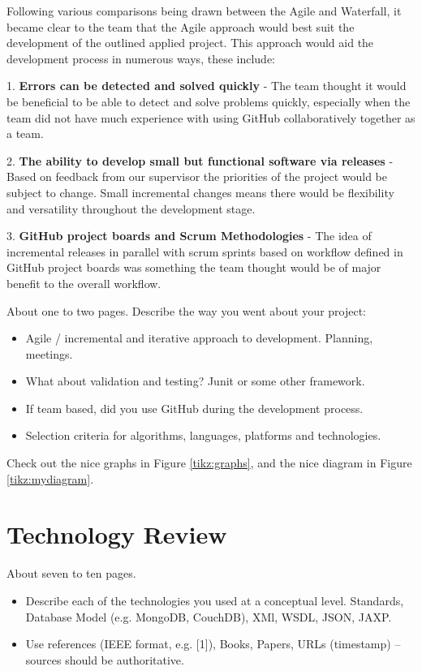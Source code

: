 Following various comparisons being drawn between the Agile and Waterfall, it became clear to the team that the Agile approach would best suit the development of the outlined applied project. This approach would aid the development process in numerous ways, these include:

\vspace{70mm} %

1. \textbf{Errors can be detected and solved quickly} - The team thought it would be beneficial to be able to detect and solve problems quickly, especially when the team did not have much experience with using GitHub collaboratively together as a team.

2. \textbf{The ability to develop small but functional software via releases} - Based on feedback from our supervisor the priorities of the project would be subject to change. Small incremental changes means there would be flexibility and versatility throughout the development stage.

3. \textbf{GitHub project boards and Scrum Methodologies} - The idea of incremental releases in parallel with scrum sprints based on workflow defined in GitHub project boards was something the team thought would be of major benefit to the overall workflow.





\vspace{70mm} %

About one to two pages.
Describe the way you went about your project:
\begin{itemize}
\item Agile / incremental and iterative approach to development. Planning, meetings.
\item What about validation and testing? Junit or some other framework.
\item If team based, did you use GitHub during the development process.
\item Selection criteria for algorithms, languages, platforms and technologies.
\end{itemize}
Check out the nice graphs in Figure \ref{tikz:graphs}, and the nice diagram in Figure \ref{tikz:mydiagram}.



\chapter{Technology Review}
About seven to ten pages.
\begin{itemize}
\item Describe each of the technologies you used at a conceptual level. Standards, Database Model (e.g. MongoDB, CouchDB), XMl, WSDL, JSON, JAXP.
\item Use references (IEEE format, e.g. [1]), Books, Papers, URLs (timestamp) – sources should be authoritative. 
\end{itemize}

